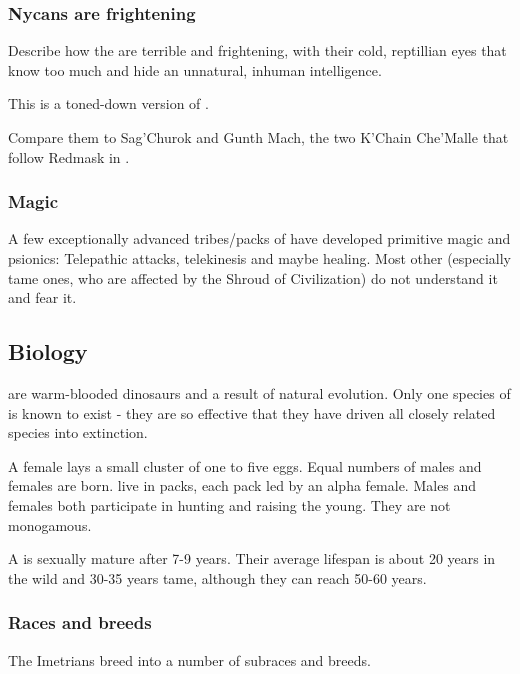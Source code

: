 \subsubsection{Nycans are frightening}
Describe how the \nycans{} are terrible and frightening, with their cold, reptillian eyes that know too much and hide an unnatural, inhuman intelligence. 

This is a toned-down version of . 

Compare them to Sag'Churok and Gunth Mach, the two K'Chain Che'Malle that follow Redmask in \MalazanReapersGale.






\subsubsection{Magic}
A few exceptionally advanced tribes/packs of \nycans{} have developed primitive magic and psionics: 
Telepathic attacks, telekinesis and maybe healing. 
Most other \nycans{} (especially tame ones, who are affected by the Shroud of Civilization) do not understand it and fear it. 









\subsection{Biology}
\Nycans{} are warm-blooded dinosaurs and a result of natural evolution. Only one species of \nycan{} is known to exist - they are so effective that they have driven all closely related species into extinction. 

A \nycan{} female lays a small cluster of one to five eggs. Equal numbers of males and females are born. \Nycans{} live in packs, each pack led by an alpha female. Males and females both participate in hunting and raising the young. They are not monogamous. 

A \nycan{} is sexually mature after 7-9 years. Their average lifespan is about 20 years in the wild and 30-35 years tame, although they can reach 50-60 years. 





\subsubsection{Races and breeds}
The Imetrians breed \nycans{} into a number of subraces and breeds. 


